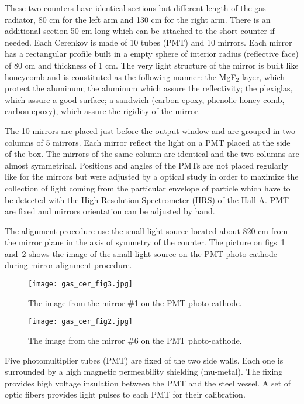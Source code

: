 These two counters have identical sections but different length of 
the gas radiator, 80 cm for the left arm and 130 cm for the right arm. 
There is an additional section 50 cm long which can be attached to 
the short counter if needed.
Each Cerenkov is made of 10  tubes (PMT) and 10 mirrors. 
Each mirror has a rectangular profile built in a empty sphere of interior radius 
(reflective face) of 80 cm and thickness of 1 cm. 
The very light structure of the mirror is built like honeycomb 
and is constituted as the following manner: the MgF$_2$ layer, which protect 
the aluminum; the aluminum which assure the reflectivity; 
the plexiglas, which assure a good surface; 
a sandwich (carbon-epoxy, phenolic honey comb, carbon epoxy), 
which assure the rigidity of the mirror. 

The 10 mirrors are placed just before the output window and are grouped in 
two columns of 5 mirrors. 
Each mirror reflect the light on a PMT placed at the side of the box. 
The mirrors of the same column are identical and the two columns are 
almost symmetrical. 
Positions and angles of the PMTs are not placed regularly like for the mirrors 
but were adjusted by a optical study in order to maximize the collection of light 
coming from the particular envelope of particle which have to be detected with 
the High Resolution Spectrometer (HRS) of the Hall A. 
PMT are fixed and mirrors orientation can be adjusted by hand. 

The alignment procedure use the small light source located about 820 cm
from the mirror plane in the axis of symmetry of the counter.
The picture on figs~\ref{fig:mirror-1} and~\ref{fig:mirror-6} 
shows the image of the small light source on the PMT photo-cathode during 
mirror alignment procedure. 
%
\begin{figure}[p]
\texttt{[image: gas\_cer\_fig3.jpg]}
\caption[The image from mirror \#1 on PMT photo-cathode]
{ The image from the mirror \#1 on the PMT photo-cathode.}
\label{fig:mirror-1}
\end{figure}
%
\begin{figure}[p]
\texttt{[image: gas\_cer\_fig2.jpg]}
\caption[The image from mirror \#6 on PMT photo-cathode]
{ The image from the mirror \#6 on the PMT photo-cathode.}
\label{fig:mirror-6}
\end{figure}

Five photomultiplier tubes (PMT) are fixed of the two side walls. 
Each one is surrounded by a high magnetic permeability shielding (mu-metal). 
The fixing provides high voltage insulation between the PMT and the steel vessel. 
A set of optic fibers provides light pulses to each PMT for their calibration. 

